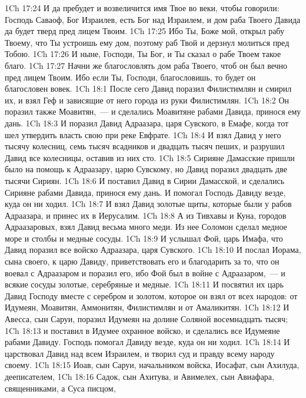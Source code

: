 \vs 1Ch 17:24 И да пребудет и возвеличится имя Твое во веки, чтобы говорили: Господь Саваоф, Бог Израилев, есть Бог над Израилем, и дом раба Твоего Давида да будет тверд пред лицем Твоим.
\vs 1Ch 17:25 Ибо Ты, Боже мой, открыл рабу Твоему, что Ты устроишь ему дом, поэтому раб Твой и дерзнул молиться пред Тобою.
\vs 1Ch 17:26 И ныне, Господи, Ты Бог, и Ты сказал о рабе Твоем такое благо.
\vs 1Ch 17:27 Начни же благословлять дом раба Твоего, чтоб он был вечно пред лицем Твоим. Ибо если Ты, Господи, благословишь, то будет он благословен вовек.
\vs 1Ch 18:1 После сего Давид поразил Филистимлян и смирил их, и взял Геф и зависящие от него города из руки Филистимлян.
\vs 1Ch 18:2 Он поразил также Моавитян,~--- и сделались Моавитяне рабами Давида, принося ему дань.
\rsbpar\vs 1Ch 18:3 И поразил Давид Адраазара, царя Сувского, в Емафе, когда тот шел утвердить власть свою при реке Евфрате.
\vs 1Ch 18:4 И взял Давид у него тысячу колесниц, семь тысяч всадников и двадцать тысяч пеших, и разрушил Давид все колесницы, оставив из них  сто.
\vs 1Ch 18:5 Сирияне Дамасские пришли было на помощь к Адраазару, царю Сувскому, но Давид поразил двадцать две тысячи Сириян.
\vs 1Ch 18:6 И поставил Давид  в Сирии Дамасской, и сделались Сирияне рабами Давида, принося ему дань. И помогал Господь Давиду везде, куда он ни ходил.
\vs 1Ch 18:7 И взял Давид золотые щиты, которые были у рабов Адраазара, и принес их в Иерусалим.
\vs 1Ch 18:8 А из Тивхавы и Куна, городов Адраазаровых, взял Давид весьма много меди. Из нее Соломон сделал медное море и столбы и медные сосуды.
\vs 1Ch 18:9 И услышал Фой, царь Имафа, что Давид поразил все войско Адраазара, царя Сувского.
\vs 1Ch 18:10 И послал Иорама, сына своего, к царю Давиду, приветствовать его и благодарить за то, что он воевал с Адраазаром и поразил его, ибо Фой был в войне с Адраазаром,~--- и  всякие сосуды золотые, серебряные и медные.
\vs 1Ch 18:11 И посвятил их царь Давид Господу вместе с серебром и золотом, которое он взял от всех народов: от Идумеян, Моавитян, Аммонитян, Филистимлян и от Амаликитян.
\vs 1Ch 18:12 И Авесса, сын Саруи, поразил Идумеян на долине Соляной восемнадцать тысяч;
\vs 1Ch 18:13 и поставил в Идумее охранное войско, и сделались все Идумеяне рабами Давиду. Господь помогал Давиду везде, куда он ни ходил.
\rsbpar\vs 1Ch 18:14 И царствовал Давид над всем Израилем, и творил суд и правду всему народу своему.
\vs 1Ch 18:15 Иоав, сын Саруи,  начальником войска, Иосафат, сын Ахилуда, дееписателем,
\vs 1Ch 18:16 Садок, сын Ахитува, и Авимелех, сын Авиафара, священниками, а Суса писцом,
